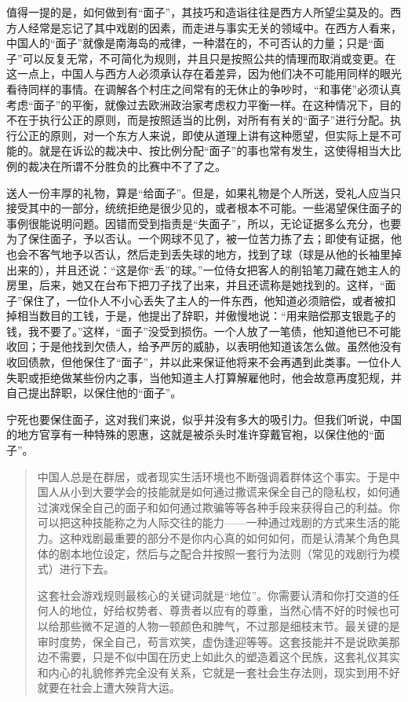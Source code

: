 \documentclass[12pt,oneside]{book}
\begin{document}
\begin{common-format}
值得一提的是，如何做到有“面子”，其技巧和造诣往往是西方人所望尘莫及的。西方人经常是忘记了其中戏剧的因素，而走进与事实无关的领域中。在西方人看来，中国人的“面子”就像是南海岛的戒律，一种潜在的，不可否认的力量；只是“面子”可以反复无常，不可简化为规则，并且只是按照公共的情理而取消或变更。在这一点上，中国人与西方人必须承认存在着差异，因为他们决不可能用同样的眼光看待同样的事情。在调解各个村庄之间常有的无休止的争吵时，“和事佬”必须认真考虑“面子”的平衡，就像过去欧洲政治家考虑权力平衡一样。在这种情况下，目的不在于执行公正的原则，而是按照适当的比例，对所有有关的“面子”进行分配。执行公正的原则，对一个东方人来说，即使从道理上讲有这种愿望，但实际上是不可能的。就是在诉讼的裁决中、按比例分配“面子”的事也常有发生，这使得相当大比例的裁决在所谓不分胜负的比赛中不了了之。 

送人一份丰厚的礼物，算是“给面子”。但是，如果礼物是个人所送，受礼人应当只接受其中的一部分，统统拒绝是很少见的，或者根本不可能。一些渴望保住面子的事例很能说明问题。因错而受到指责是“失面子”，所以，无论证据多么充分，也要为了保住面子，予以否认。一个网球不见了，被一位苦力拣了去；即使有证据，他也会不客气地予以否认，然后走到丢失球的地方，找到了球（球是从他的长袖里掉出来的），并且还说：“这是你“丢”的球。”一位侍女把客人的削铅笔刀藏在她主人的房里，后来，她又在台布下把刀子找了出来，并且还谎称是她找到的。这样，“面子”保住了，一位仆人不小心丢失了主人的一件东西，他知道必须赔偿，或者被扣掉相当数目的工钱，于是，他提出了辞职，并傲慢地说：“用来赔偿那支银匙子的钱，我不要了。”这样，“面子”没受到损伤。一个人放了一笔债，他知道他已不可能收回；于是他找到欠债人，给予严厉的威胁，以表明他知道该怎么做。虽然他没有收回债款，但他保住了“面子”，并以此来保证他将来不会再遇到此类事。一位仆人失职或拒绝做某些份内之事，当他知道主人打算解雇他时，他会故意再度犯规，并自己提出辞职，以保住他的“面子”。 

宁死也要保住面子，这对我们来说，似乎并没有多大的吸引力。但我们听说，中国的地方官享有一种特殊的恩惠，这就是被杀头时准许穿戴官袍，以保住他的“面子”。


\begin{quotation}
中国人总是在群居，或者现实生活环境也不断强调着群体这个事实。于是中国人从小到大要学会的技能就是如何通过撒谎来保全自己的隐私权，如何通过演戏保全自己的面子和如何通过欺骗等等各种手段来获得自己的利益。你可以把这种技能称之为人际交往的能力——一种通过戏剧的方式来生活的能力。这种戏剧最重要的部分不是你内心真的如何如何，而是认清某个角色具体的剧本地位设定，然后与之配合并按照一套行为法则（常见的戏剧行为模式）进行下去。

这套社会游戏规则最核心的关键词就是“地位”。你需要认清和你打交道的任何人的地位，好给权势者、尊贵者以应有的尊重，当然心情不好的时候也可以给那些微不足道的人物一顿颜色和脾气，不过那是细枝末节。最关键的是审时度势，保全自己，苟言欢笑，虚伪逢迎等等。这套技能并不是说欧美那边不需要，只是不似中国在历史上如此久的塑造着这个民族，这套礼仪其实和内心的礼貌修养完全没有关系，它就是一套社会生存法则，现实到用不好就要在社会上遭大殃背大运。


\end{quotation}
\end{common-format}
\end{document}
